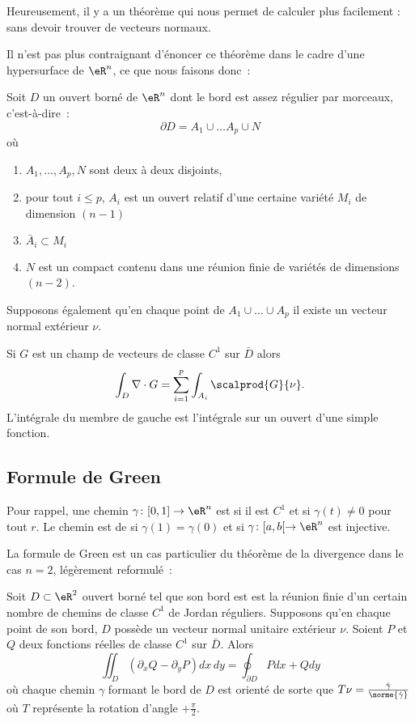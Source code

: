 Heureusement, il y a un théorème qui nous permet de calculer plus facilement : sans devoir trouver de vecteurs normaux.

Il n'est pas plus contraignant d'énoncer ce théorème dans le cadre d'une hypersurface de $\eR^n$, ce que nous faisons donc~:
\begin{theorem}
	Soit $D$ un ouvert borné de $\eR^n$ dont le bord est \og assez régulier par morceaux\fg{}, c'est-à-dire~:
	\begin{equation}
		\partial D = A_1 \cup \ldots A_p \cup N
	\end{equation} 
	où
	\begin{enumerate}
		\item $A_1, \ldots, A_p, N$ sont deux à deux disjoints,
		\item pour tout $i \leq p$, $A_i$ est un ouvert relatif d'une certaine variété $M_i$ de dimension $(n-1)$
		\item $\bar A_i \subset M_i$
		\item $N$ est un compact contenu dans une réunion finie de variétés de dimensions $(n-2)$.
	\end{enumerate}
	Supposons également qu'en chaque point de $A_1 \cup \ldots \cup A_p$ il existe un vecteur normal extérieur $\nu$.
	
	Si $G$ est un champ de vecteurs de classe $C^1$ sur $\bar D$ alors
	\begin{equation}
		\int_D \nabla\cdot G = \sum_{i=1}^p \int_{A_i} \scalprod{G}{\nu}.
	\end{equation}
	L'intégrale du membre de gauche est l'intégrale sur un ouvert d'une simple fonction.
\end{theorem}

\subsection{Formule de Green}

Pour rappel, une chemin $\gamma\colon \mathopen[ 0 , 1 \mathclose]\to \eR^n$ est  si il est $C^1$ et si $\gamma(t)\neq 0$ pour tout $r$. Le chemin est de  si $\gamma(1)=\gamma(0)$ et si $\gamma\colon \mathopen[ a , b [\to \eR^n$ est injective.

La formule de Green est un cas particulier du théorème de la divergence dans
le cas $n = 2$, légèrement reformulé~:
\begin{theorem}
	Soit $D \subset \eR^2$ ouvert borné tel que son bord est est la réunion finie d'un certain nombre de chemins de classe $C^1$ de Jordan réguliers.  Supposons qu'en chaque point de son bord, $D$ possède un vecteur normal unitaire extérieur $\nu$. Soient $P$ et $Q$ deux fonctions réelles de classe $C^1$ sur $\bar D$. Alors
    \begin{equation}  \label{EqYLblSqV}
    \iint_D (\partial_xQ - \partial_yP)dx\,dy = \oint_{\partial D}
    Pd x + Q d y
  \end{equation}
  où chaque chemin $\gamma$ formant le bord de $D$ est orienté de
  sorte que $T \nu = \frac{\dot\gamma}{\norme{\dot\gamma}}$ où $T$
  représente la rotation d'angle $+\frac\pi2$.
\end{theorem}

